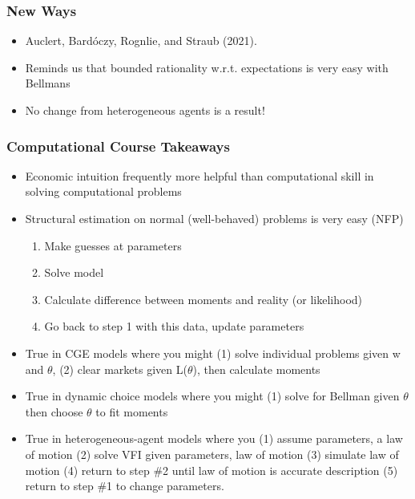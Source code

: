\documentclass{beamer}
\begin{document}
\begin{frame}
\frametitle[alignment=center]{New Ways}
\begin{itemize}
\bigskip
\item Auclert, Bard\'{o}czy, Rognlie, and Straub (2021).
\bigskip
\item Reminds us that bounded rationality w.r.t. expectations is very easy with Bellmans
\bigskip
\item No change from heterogeneous agents is a result!
\end{itemize}
\end{frame}



\begin{frame}
\frametitle[alignment=center]{Computational Course Takeaways}
\small
\begin{itemize}
\item Economic intuition frequently more helpful than computational skill in solving computational problems
\item Structural estimation on normal (well-behaved) problems is very easy (NFP)
\begin{enumerate}
\item Make guesses at parameters
\item Solve model
\item Calculate difference between moments and reality (or likelihood)
\item Go back to step 1 with this data, update parameters
\end{enumerate}
\item True in CGE models where you might (1) solve individual problems given w and $\theta$, (2) clear markets given L($\theta$), then calculate moments
\item True in dynamic choice models where you might (1) solve for Bellman given $\theta$  then choose $\theta$ to fit moments
\item True in heterogeneous-agent models where you (1) assume parameters, a law of motion (2) solve VFI given parameters, law of motion (3) simulate law of motion (4) return to step \#2 until law of motion is accurate description (5) return to step \#1 to change parameters.
\end{itemize}
\end{frame}
\end{document}
